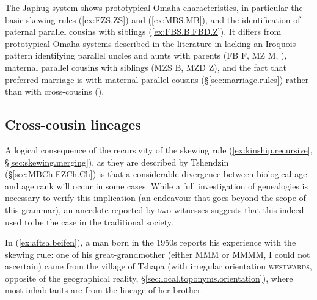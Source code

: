The Japhug system shows prototypical Omaha characteristics, in particular the basic skewing rules  (\ref{ex:FZS.ZS}) and (\ref{ex:MBS.MB}), and the identification of paternal parallel cousins with siblings (\ref{ex:FBS.B.FBD.Z}). It differs from prototypical Omaha systems described in the literature in lacking an Iroquois pattern identifying parallel uncles and aunts with parents (FB \fl{} F, MZ \fl{} M, \citealt[34]{trautmann12crossness}), maternal parallel cousins with siblings (MZS \fl{} B, MZD \fl{} Z), and the fact that preferred marriage is with maternal parallel cousins (§\ref{sec:marriage.rules}) rather than with cross-cousins (\citealt[41]{trautmann12crossness}).
 

 \subsection{Cross-cousin lineages} \label{sec:MBChCh.Dpalcan}
A logical consequence of the recursivity of the skewing rule (\ref{ex:kinship.recursive}, §\ref{sec:skewing.merging}), as they are described by Tshendzin (§\ref{sec:MBCh.FZCh.Ch}) is that a considerable divergence between biological age and age rank will occur in some cases. While a full investigation of genealogies is necessary to verify this implication (an endeavour that goes beyond the scope of this grammar), an  anecdote reported by two witnesses suggests that this indeed used to be the case in the traditional society.

In (\ref{ex:aftsa.beifen}), a man born in the 1950s reports his experience with the skewing rule: one of his great-grandmother (either MMM or MMMM, I could not ascertain) came from the village of Tshapa (with irregular orientation \textsc{westwards}, opposite of the geographical reality, §\ref{sec:local.toponyms.orientation}), where most inhabitants are from the lineage of her brother.

